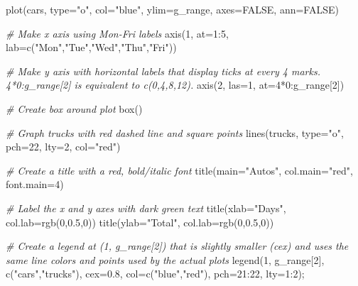 \documentclass[
]{article}
\newenvironment{Shaded}{\begin{snugshade}}{\end{snugshade}}
\newcommand{\AttributeTok}[1]{\textcolor[rgb]{0.77,0.63,0.00}{#1}}
\newcommand{\CommentTok}[1]{\textcolor[rgb]{0.56,0.35,0.01}{\textit{#1}}}
\newcommand{\ConstantTok}[1]{\textcolor[rgb]{0.00,0.00,0.00}{#1}}
\newcommand{\DecValTok}[1]{\textcolor[rgb]{0.00,0.00,0.81}{#1}}
\newcommand{\FloatTok}[1]{\textcolor[rgb]{0.00,0.00,0.81}{#1}}
\newcommand{\FunctionTok}[1]{\textcolor[rgb]{0.00,0.00,0.00}{#1}}
\newcommand{\NormalTok}[1]{#1}
\newcommand{\SpecialCharTok}[1]{\textcolor[rgb]{0.00,0.00,0.00}{#1}}
\newcommand{\StringTok}[1]{\textcolor[rgb]{0.31,0.60,0.02}{#1}}
\begin{document}
\begin{Shaded}
\begin{Highlighting}[]
\FunctionTok{plot}\NormalTok{(cars, }\AttributeTok{type=}\StringTok{"o"}\NormalTok{, }\AttributeTok{col=}\StringTok{"blue"}\NormalTok{, }\AttributeTok{ylim=}\NormalTok{g\_range, }\AttributeTok{axes=}\ConstantTok{FALSE}\NormalTok{, }\AttributeTok{ann=}\ConstantTok{FALSE}\NormalTok{)}

\CommentTok{\# Make x axis using Mon{-}Fri labels}
\FunctionTok{axis}\NormalTok{(}\DecValTok{1}\NormalTok{, }\AttributeTok{at=}\DecValTok{1}\SpecialCharTok{:}\DecValTok{5}\NormalTok{, }\AttributeTok{lab=}\FunctionTok{c}\NormalTok{(}\StringTok{"Mon"}\NormalTok{,}\StringTok{"Tue"}\NormalTok{,}\StringTok{"Wed"}\NormalTok{,}\StringTok{"Thu"}\NormalTok{,}\StringTok{"Fri"}\NormalTok{))}

\CommentTok{\# Make y axis with horizontal labels that display ticks at every 4 marks. 4*0:g\_range[2] is equivalent to c(0,4,8,12).}
\FunctionTok{axis}\NormalTok{(}\DecValTok{2}\NormalTok{, }\AttributeTok{las=}\DecValTok{1}\NormalTok{, }\AttributeTok{at=}\DecValTok{4}\SpecialCharTok{*}\DecValTok{0}\SpecialCharTok{:}\NormalTok{g\_range[}\DecValTok{2}\NormalTok{])}

\CommentTok{\# Create box around plot}
\FunctionTok{box}\NormalTok{()}

\CommentTok{\# Graph trucks with red dashed line and square points}
\FunctionTok{lines}\NormalTok{(trucks, }\AttributeTok{type=}\StringTok{"o"}\NormalTok{, }\AttributeTok{pch=}\DecValTok{22}\NormalTok{, }\AttributeTok{lty=}\DecValTok{2}\NormalTok{, }\AttributeTok{col=}\StringTok{"red"}\NormalTok{)}

\CommentTok{\# Create a title with a red, bold/italic font}
\FunctionTok{title}\NormalTok{(}\AttributeTok{main=}\StringTok{"Autos"}\NormalTok{, }\AttributeTok{col.main=}\StringTok{"red"}\NormalTok{, }\AttributeTok{font.main=}\DecValTok{4}\NormalTok{)}

\CommentTok{\# Label the x and y axes with dark green text}
\FunctionTok{title}\NormalTok{(}\AttributeTok{xlab=}\StringTok{"Days"}\NormalTok{, }\AttributeTok{col.lab=}\FunctionTok{rgb}\NormalTok{(}\DecValTok{0}\NormalTok{,}\FloatTok{0.5}\NormalTok{,}\DecValTok{0}\NormalTok{))}
\FunctionTok{title}\NormalTok{(}\AttributeTok{ylab=}\StringTok{"Total"}\NormalTok{, }\AttributeTok{col.lab=}\FunctionTok{rgb}\NormalTok{(}\DecValTok{0}\NormalTok{,}\FloatTok{0.5}\NormalTok{,}\DecValTok{0}\NormalTok{))}

\CommentTok{\# Create a legend at (1, g\_range[2]) that is slightly smaller (cex) and uses the same line colors and points used by the actual plots}
\FunctionTok{legend}\NormalTok{(}\DecValTok{1}\NormalTok{, g\_range[}\DecValTok{2}\NormalTok{], }\FunctionTok{c}\NormalTok{(}\StringTok{"cars"}\NormalTok{,}\StringTok{"trucks"}\NormalTok{), }\AttributeTok{cex=}\FloatTok{0.8}\NormalTok{, }\AttributeTok{col=}\FunctionTok{c}\NormalTok{(}\StringTok{"blue"}\NormalTok{,}\StringTok{"red"}\NormalTok{), }\AttributeTok{pch=}\DecValTok{21}\SpecialCharTok{:}\DecValTok{22}\NormalTok{, }\AttributeTok{lty=}\DecValTok{1}\SpecialCharTok{:}\DecValTok{2}\NormalTok{);}
\end{Highlighting}
\end{Shaded}
\end{document}
